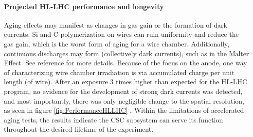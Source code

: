 \documentclass[a4paper,11pt]{article}
\begin{document}
\paragraph{Projected HL-LHC performance and longevity}
Aging effects may manifest as changes in gas gain or the formation of dark currents. Si and C polymerization on wires can ruin uniformity and reduce the gas gain, which is the worst form of aging for a wire chamber. Additionally, continuous discharges may form (collectively dark currents), such as in the Malter Effect. See reference \cite{aging} for more details. Because of the focus on the anode, one way of characterizing wire chamber irradiation is via accumulated charge per unit length (of wire). After an exposure 3 times higher than expected for the HL-LHC program, no evidence for the development of strong dark currents was detected, and most importantly, there was only negligible change to the spatial resolution, as seen in figure \ref{fig:PerformanceHLLHC} \cite{highlights}. Within the limitations of accelerated aging tests, the results indicate the CSC subsystem can serve its function throughout the desired lifetime of the experiment.
\end{document}
